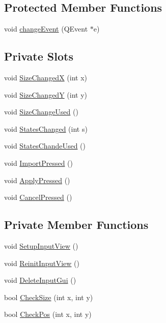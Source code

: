 \subsection*{Protected Member Functions}
\begin{DoxyCompactItemize}
\item 
void \hyperlink{classCWidgetInput_a171b7d755f85804e2b87ded2cce69f69}{changeEvent} (QEvent $\ast$e)
\end{DoxyCompactItemize}
\subsection*{Private Slots}
\begin{DoxyCompactItemize}
\item 
void \hyperlink{classCWidgetInput_a68fcce29dd80cbc85cbab1390c2ac76e}{SizeChangedX} (int x)
\item 
void \hyperlink{classCWidgetInput_a73741d0ba03a59ac34dc00a7f789778c}{SizeChangedY} (int y)
\item 
void \hyperlink{classCWidgetInput_a5c7632de26c6a99e30aea469305412d1}{SizeChangeUsed} ()
\item 
void \hyperlink{classCWidgetInput_a8ae1871cbd815138e3eca28256b4e16f}{StatesChanged} (int s)
\item 
void \hyperlink{classCWidgetInput_accbc250762c28fe7b5b49f70e244342a}{StatesChandeUsed} ()
\item 
void \hyperlink{classCWidgetInput_a5112cafe4e68baf7952ddfa2b055ca5c}{ImportPressed} ()
\item 
void \hyperlink{classCWidgetInput_ab10814805e99bd5839153a73c6136e6b}{ApplyPressed} ()
\item 
void \hyperlink{classCWidgetInput_aa721d6a214bb831647927290f79a3d95}{CancelPressed} ()
\end{DoxyCompactItemize}
\subsection*{Private Member Functions}
\begin{DoxyCompactItemize}
\item 
void \hyperlink{classCWidgetInput_ae5a1b1557fa5bbac8aa208584a3fa6c5}{SetupInputView} ()
\item 
void \hyperlink{classCWidgetInput_a6cfb1a08d26184ca978e429e598a1b05}{ReinitInputView} ()
\item 
void \hyperlink{classCWidgetInput_a5290e35eb931ebd4d6dd107d75bf6caf}{DeleteInputGui} ()
\item 
bool \hyperlink{classCWidgetInput_a0fd93c8aac117143c1365f9409a52dbd}{CheckSize} (int x, int y)
\item 
bool \hyperlink{classCWidgetInput_a93f4450ea15aa7db59da2b4534ad7a33}{CheckPos} (int x, int y)
\end{DoxyCompactItemize}
